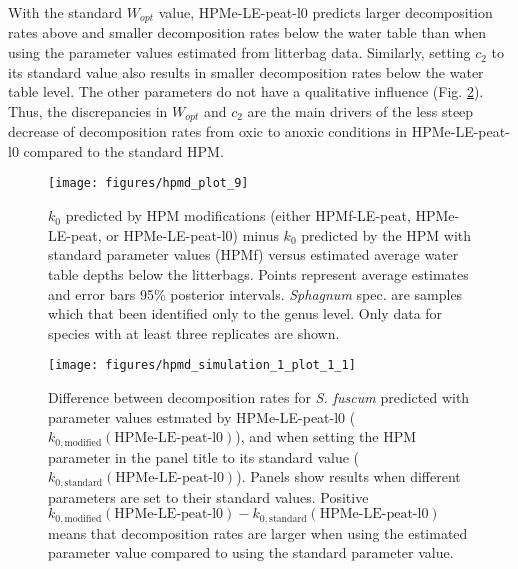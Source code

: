 \documentclass[esd, manuscript]{copernicus}
\begin{document}
With the standard \(W_{opt}\) value, HPMe-LE-peat-l0 predicts larger decomposition rates above and smaller decomposition rates below the water table than when using the parameter values estimated from litterbag data. Similarly, setting \(c_2\) to its standard value also results in smaller decomposition rates below the water table level. The other parameters do not have a qualitative influence (Fig. \ref{fig:out-sdm-parameters-standard-vs-estimated-p1}). Thus, the discrepancies in \(W_{opt}\) and \(c_2\) are the main drivers of the less steep decrease of decomposition rates from oxic to anoxic conditions in HPMe-LE-peat-l0 compared to the standard HPM.



\begin{figure}[H]

{\centering \texttt{[image: figures/hpmd\_plot\_9]} 

}

\caption{\(k_0\) predicted by HPM modifications (either HPMf-LE-peat, HPMe-LE-peat, or HPMe-LE-peat-l0) minus \(k_0\) predicted by the HPM with standard parameter values (HPMf) versus estimated average water table depths below the litterbags. Points represent average estimates and error bars 95\% posterior intervals. \emph{Sphagnum} spec. are samples which that been identified only to the genus level. Only data for species with at least three replicates are shown.}\label{fig:out-p-hpmd-plot-9}
\end{figure}



\begin{figure}[H]

{\centering \texttt{[image: figures/hpmd\_simulation\_1\_plot\_1\_1]} 

}

\caption{Difference between decomposition rates for \emph{S. fuscum} predicted with parameter values estmated by HPMe-LE-peat-l0 (\(k_{0,\text{modified}}(\text{HPMe-LE-peat-l0})\)), and when setting the HPM parameter in the panel title to its standard value (\(k_{0,\text{standard}}(\text{HPMe-LE-peat-l0})\)). Panels show results when different parameters are set to their standard values. Positive \(k_{0,\text{modified}}(\text{HPMe-LE-peat-l0}) - k_{0,\text{standard}}(\text{HPMe-LE-peat-l0})\) means that decomposition rates are larger when using the estimated parameter value compared to using the standard parameter value.}\label{fig:out-sdm-parameters-standard-vs-estimated-p1}
\end{figure}
\end{document}
